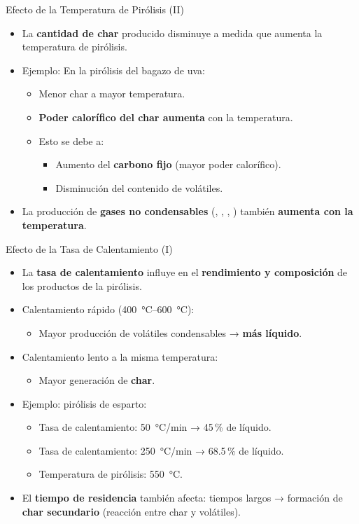 \documentclass[../../main.tex]{subfiles}
\begin{document}
\begin{frame}{Efecto de la Temperatura de Pirólisis (II)}
\small
\begin{itemize}
  \item La \textbf{cantidad de char} producido disminuye a medida que aumenta la temperatura de pirólisis.
  \item Ejemplo: En la pirólisis del bagazo de uva:
  \begin{itemize}
    \item Menor char a mayor temperatura.
    \item \textbf{Poder calorífico del char aumenta} con la temperatura.
    \item Esto se debe a:
    \begin{itemize}
      \item Aumento del \textbf{carbono fijo} (mayor poder calorífico).
      \item Disminución del contenido de volátiles.
    \end{itemize}
  \end{itemize}
  \item La producción de \textbf{gases no condensables} (, , , ) también \textbf{aumenta con la temperatura}.
\end{itemize}
\end{frame}


\begin{frame}{Efecto de la Tasa de Calentamiento (I)}
\small
\begin{itemize}
  \item La \textbf{tasa de calentamiento} influye en el \textbf{rendimiento y composición} de los productos de la pirólisis.
  \item Calentamiento rápido (\SI{400}{\degreeCelsius}–\SI{600}{\degreeCelsius}):
  \begin{itemize}
    \item Mayor producción de volátiles condensables → \textbf{más líquido}.
  \end{itemize}
  \item Calentamiento lento a la misma temperatura:
  \begin{itemize}
    \item Mayor generación de \textbf{char}.
  \end{itemize}
  \item Ejemplo: pirólisis de esparto: %
  \begin{itemize}
    \item Tasa de calentamiento: \SI{50}{\degreeCelsius/min} → 45 \% de líquido.
    \item Tasa de calentamiento: \SI{250}{\degreeCelsius/min} → 68.5 \% de líquido.
    \item Temperatura de pirólisis: \SI{550}{\degreeCelsius}.
  \end{itemize}
  \item El \textbf{tiempo de residencia} también afecta: tiempos largos → formación de \textbf{char secundario} (reacción entre char y volátiles).
\end{itemize}
\end{frame}
\end{document}

